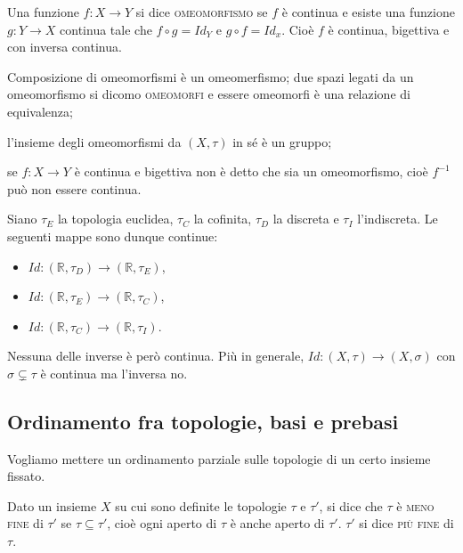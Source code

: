\documentclass{article}
\begin{document}
\begin{defn}
Una funzione $f: X \rightarrow Y$ si dice \textsc{omeomorfismo} se $f$ è
continua e esiste una funzione $g:Y\rightarrow X$ continua tale che $f \circ g =
Id_Y$ e $g \circ f = Id_x$. Cio\`e $f$ \`e continua, bigettiva e con inversa
continua.
\end{defn}

\begin{oss}
	\begin{nlist}
	\item Composizione di omeomorfismi è un omeomerfismo; due spazi legati da un
	omeomorfismo si dicomo \textsc{omeomorfi} e essere omeomorfi è una relazione
	di equivalenza;
	\item l'insieme degli omeomorfismi da $(X, \tau)$ in sé è un gruppo;
	\item se $f:X \rightarrow Y$ è continua e bigettiva non è detto che sia un
	omeomorfismo, cioè $f^{-1}$ può non essere continua.
    \marginpar{\warningsign}
\end{nlist}
\end{oss}

\begin{ex}
	Siano $\tau_E$ la topologia euclidea, $\tau_C$ la cofinita, $\tau_D$ la
	discreta e $\tau_I$ l'indiscreta. Le seguenti mappe sono dunque continue:
    \begin{itemize}
	\item $Id:(\mathbb{R}, \tau_D) \rightarrow (\mathbb{R}, \tau_E)$,
    \item $Id:(\mathbb{R}, \tau_E) \rightarrow (\mathbb{R}, \tau_C)$,
    \item $Id:(\mathbb{R}, \tau_C) \rightarrow (\mathbb{R}, \tau_I)$.
    \end{itemize}
    Nessuna delle inverse è però continua. Più in generale, $Id: (X, \tau)
    \rightarrow (X, \sigma)$ con $\sigma \subsetneq \tau$ è continua ma
    l'inversa no.
\end{ex}

\subsection{Ordinamento fra topologie, basi e prebasi}

Vogliamo mettere un ordinamento parziale sulle topologie di un certo insieme
fissato.

\begin{defn}
Dato un insieme $X$ su cui sono definite le topologie $\tau$ e $\tau'$, si dice
che $\tau$ \`e \textsc{meno fine} di $\tau'$ se $\tau \subseteq \tau'$, cioè
ogni aperto di $\tau$ è anche aperto di $\tau'$. $\tau'$ si dice \textsc{più
fine} di $\tau$.
\end{defn}
\end{document}

